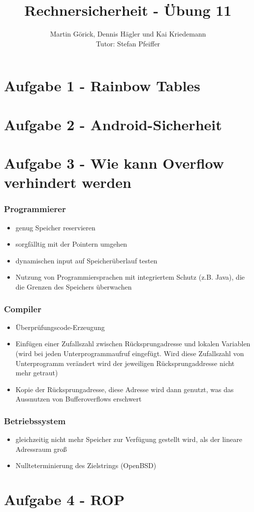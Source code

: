 \documentclass{scrartcl}
\title{Rechnersicherheit - Übung 11}
\author{Martin Görick, Dennis Hägler und Kai Kriedemann \\ Tutor: Stefan Pfeiffer}
\begin{document}
\maketitle


\section*{Aufgabe 1 - Rainbow Tables}


\section*{Aufgabe 2 - Android-Sicherheit}



\section*{Aufgabe 3 - Wie kann Overflow verhindert werden}
\subsubsection{Programmierer}
  \begin{itemize}
    \item genug Speicher reservieren
    \item sorgfälltig mit der Pointern umgehen
    \item dynamischen input auf Speicherüberlauf testen
    \item Nutzung von Programmiersprachen mit integriertem Schutz (z.B. Java),
      die die Grenzen des Speichers überwachen
  \end{itemize}

\subsubsection{Compiler}
  \begin{itemize}
    \item Überprüfungscode-Erzeugung
    \item Einfügen einer Zufallszahl zwischen Rücksprungadresse und lokalen
      Variablen (wird bei jeden Unterprogrammaufruf eingefügt. Wird diese
      Zufallszahl von Unterprogramm verändert wird der jeweiligen
      Rücksprungaddresse nicht mehr getraut)
    \item Kopie der Rücksprungadresse, diese Adresse wird dann genutzt, was das
      Aussnutzen von Bufferoverflows erschwert
  \end{itemize}
\subsubsection{Betriebssystem}
  \begin{itemize}
    \item  gleichzeitig nicht mehr Speicher zur Verfügung gestellt wird, als der
      lineare Adressraum groß
    \item Nullteterminierung des Zielstrings (OpenBSD)
  \end{itemize}


\section*{Aufgabe 4 - ROP}
\end{document}
